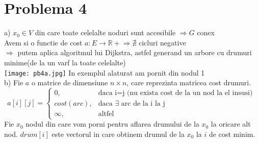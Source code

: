 \documentclass{article}
\begin{document}
\newpage
\section*{Problema 4}
\Large
a) $x_{0} \in V$ din care toate celelalte noduri sunt accesibile $\Rightarrow G$ conex\\
Avem si o functie de cost $a:E \rightarrow \mathbb{R+} \Rightarrow \nexists$ cicluri negative\\
$\Rightarrow$ putem aplica algoritmul lui Dijkstra, astfel generand un arbore cu drumuri minime(de la un varf la toate celelalte)\\

\texttt{[image: pb4a.jpg]}
In exemplul alaturat am pornit din nodul 1
\bigskip\\
b) Fie $a$ o matrice de dimensiune $n\times n$, care reprezinta matricea cost drumuri.
\[
    a[i][j]=
\begin{cases}
    0,& \text{daca  i=j (nu exista cost de la un nod la el insusi) }\\
    cost(arc),& \text{daca  $\exists$ arc de la i la j }\\
    \infty,              & \text{altfel}
\end{cases}
\]
Fie $x_{0}$ nodul din care vom porni pentru aflarea drumului de la $x_{0}$ la oricare alt nod. $drum[i]$ este vectorul in care obtinem drumul de la $x_{0}$ la $i$ de cost minim.
\makeatletter
\def\BState{\State\hskip-\ALG@thistlm}
\makeatother
\begin{algorithm}
\end{algorithm}
\end{document}
